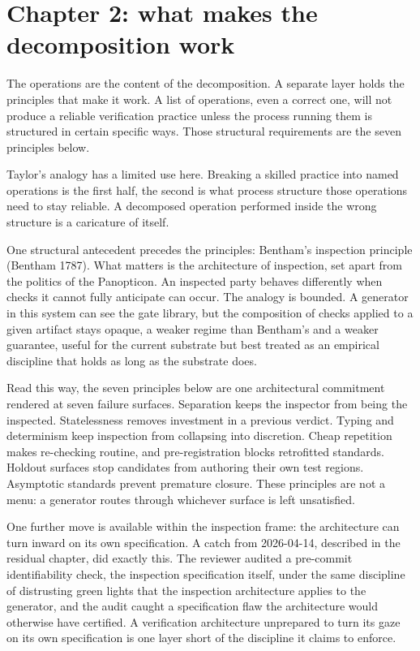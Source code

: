 \documentclass[
  11pt,
]{article}
\begin{document}
\section{Chapter 2: what makes the decomposition
work}\label{chapter-2-what-makes-the-decomposition-work}

The operations are the content of the decomposition. A separate layer
holds the principles that make it work. A list of operations, even a
correct one, will not produce a reliable verification practice unless the
process running them is structured in certain specific ways. Those
structural requirements are the seven principles below.

Taylor's analogy has a limited use here. Breaking a skilled practice
into named operations is the first half, the second is what process
structure those operations need to stay reliable. A decomposed operation
performed inside the wrong structure is a caricature of itself.

One structural antecedent precedes the principles: Bentham's inspection
principle (Bentham 1787). What matters is the architecture of inspection,
set apart from the politics of the Panopticon. An inspected party behaves
differently when checks it cannot fully anticipate can occur. The analogy
is bounded. A generator in this system can see the gate library, but the
composition of checks applied to a given artifact stays opaque, a
weaker regime than Bentham's and a weaker guarantee, useful for the current
substrate but best treated as an empirical discipline that holds as long
as the substrate does.

Read this way, the seven principles below are one architectural
commitment rendered at seven failure surfaces. Separation keeps the
inspector from being the inspected. Statelessness removes investment in a
previous verdict. Typing and determinism keep inspection from collapsing
into discretion. Cheap repetition makes re-checking routine, and
pre-registration blocks retrofitted standards. Holdout surfaces stop
candidates from authoring their own test regions. Asymptotic standards
prevent premature closure. These principles are not a menu: a generator
routes through whichever surface is left unsatisfied.

One further move is available within the inspection frame: the
architecture can turn inward on its own specification. A catch from
2026-04-14, described in the residual chapter, did exactly this. The
reviewer audited a pre-commit identifiability check, the inspection
specification itself, under the same discipline of distrusting green
lights that the inspection architecture applies to the generator, and the
audit caught a specification flaw the architecture would otherwise have
certified. A verification architecture unprepared to turn its gaze on its
own specification is one layer short of the discipline it claims to
enforce.
\end{document}
